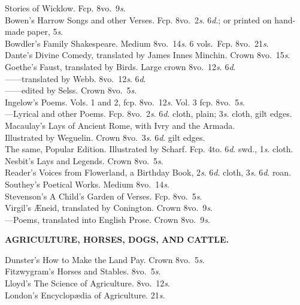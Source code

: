 \documentclass[letterpaper,12pt,oneside,openany]{memoir}
\newcommand{\D}{\hspace*{5mm}}
\newcommand{\E}{\hspace*{2mm}---\hspace*{2mm}}
\begin{document}
\begin{footnotesize}
\D Stories of Wicklow. Fcp. 8vo.\ 9\textit{s}.\\
Bowen's Harrow Songs and other Verses. Fcp. 8vo.\ 2\textit{s}. 6\textit{d}.; or printed on hand-made paper, 5\textit{s}.\\
Bowdler's Family Shakespeare. Medium 8vo.\ 14\textit{s}. 6 vols.\ Fcp. 8vo.\ 21\textit{s}.\\
Dante's Divine Comedy, translated by James Innes Minchin. Crown 8vo.\ 15\textit{s}.\\
Goethe's Faust, translated by Birds. Large crown 8vo.\ 12\textit{s}. 6\textit{d}.\\
\E \E translated by Webb. 8vo.\ 12\textit{s}. 6\textit{d}.\\
\E \E edited by Selss. Crown 8vo.\ 5\textit{s}.\\
Ingelow's Poems. Vols. 1 and 2, fcp. 8vo.\ 12\textit{s}. Vol. 3 fcp. 8vo.\ 5\textit{s}.\\
\E Lyrical and other Poems. Fcp. 8vo.\ 2\textit{s}. 6\textit{d}. cloth, plain; 3\textit{s}. cloth, gilt edges.\\
Macaulay's Lays of Ancient Rome, with Ivry and the Armada.\\
\D Illustrated by Weguelin. Crown 8vo.\ 3\textit{s}. 6\textit{d}. gilt edges.\\
\D The same, Popular Edition. Illustrated by Scharf. Fcp. 4to. 6\textit{d}. swd., 1\textit{s}. cloth.\\
Nesbit's Lays and Legends. Crown 8vo.\ 5\textit{s}.\\
Reader's Voices from Flowerland, a Birthday Book, 2\textit{s}. 6\textit{d}. cloth, 3\textit{s}. 6\textit{d}. roan.\\
Southey's Poetical Works. Medium 8vo.\ 14\textit{s}.\\
Stevenson's A Child's Garden of Verses. Fcp. 8vo.\ 5\textit{s}.\\
Virgil's {\AE}neid, translated by Conington. Crown 8vo.\ 9\textit{s}.\\
\E Poems, translated into English Prose. Crown 8vo.\ 9\textit{s}.
\begin{center}
\textbf{AGRICULTURE, HORSES, DOGS, AND CATTLE.}
\end{center}
Dunster's How to Make the Land Pay. Crown 8vo.\ 5\textit{s}.\\
Fitzwygram's Horses and Stables. 8vo.\ 5\textit{s}.\\
Lloyd's The Science of Agriculture. 8vo.\ 12\textit{s}.\\
London's Encyclop{\ae}dia of Agriculture. 21\textit{s}.\\

\end{footnotesize}
\end{document}

